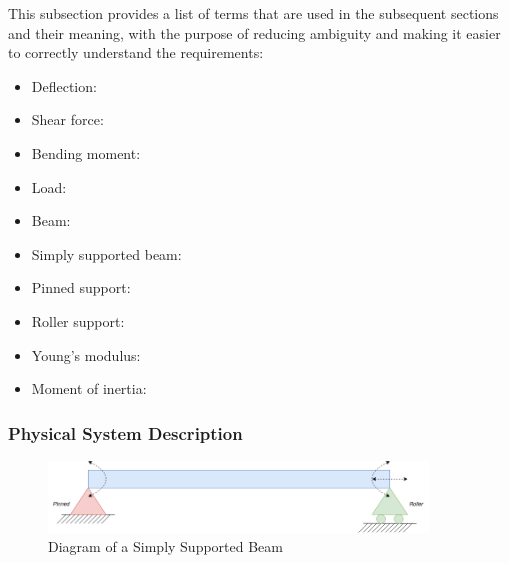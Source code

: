 \documentclass[12pt]{article}
\begin{document}

This subsection provides a list of terms that are used in the subsequent
sections and their meaning, with the purpose of reducing ambiguity and making it
easier to correctly understand the requirements:


\begin{itemize}

    \item Deflection:

    \item Shear force:

    \item Bending moment:

    \item Load:

    \item Beam:

    \item Simply supported beam:

    \item Pinned support:

    \item Roller support:

    \item Young's modulus:

    \item Moment of inertia:

\end{itemize}

\subsubsection{Physical System Description} \label{sec_phySystDescrip}

\begin{figure}[H]
    \begin{center}
        \includegraphics[width=0.9\textwidth]{temp/beam_bending_diagram.drawio.png}
        \caption{\label{beam_bending_diagram} Diagram of a Simply Supported Beam}
    \end{center}
\end{figure}
\end{document}
